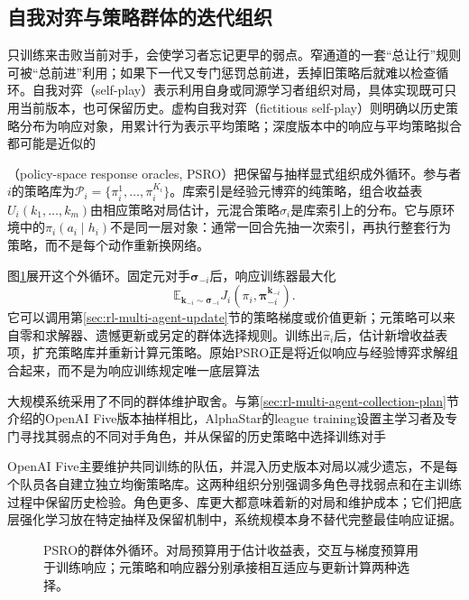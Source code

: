 \subsection{自我对弈与策略群体的迭代组织}
\label{sec:rl-multi-agent-population}

只训练来击败当前对手，会使学习者忘记更早的弱点。窄通道的一套“总让行”规则可被“总前进”利用；如果下一代又专门惩罚总前进，丢掉旧策略后就难以检查循环。自我对弈（self-play）表示利用自身或同源学习者组织对局，具体实现既可只用当前版本，也可保留历史。虚构自我对弈（fictitious self-play）则明确以历史策略分布为响应对象，用累计行为表示平均策略；深度版本中的响应与平均策略拟合都可能是近似的

（policy-space response oracles, PSRO）把保留与抽样显式组织成外循环。参与者$i$的策略库为$\mathcal P_i=\{\pi_i^1,\ldots,\pi_i^{K_i}\}$。库索引是经验元博弈的纯策略，组合收益表
$U_i(k_1,\ldots,k_m)$由相应策略对局估计，元混合策略$\sigma_i$是库索引上的分布。它与原环境中的$\pi_i(a_i\mid h_i)$不是同一层对象：通常一回合先抽一次索引，再执行整套行为策略，而不是每个动作重新换网络。

图\ref{fig:rl-multi-agent-psro}展开这个外循环。固定元对手$\bm\sigma_{-i}$后，响应训练器最大化
\[
 \mathbb E_{\bm k_{-i}\sim\bm\sigma_{-i}}
       J_i(\pi_i,\bm\pi_{-i}^{\bm k_{-i}}).
\]
它可以调用第\ref{sec:rl-multi-agent-update}节的策略梯度或价值更新；元策略可以来自零和求解器、遗憾更新或另定的群体选择规则。训练出$\hat\pi_i$后，估计新增收益表项，扩充策略库并重新计算元策略。原始PSRO正是将近似响应与经验博弈求解组合起来，而不是为响应训练规定唯一底层算法

大规模系统采用了不同的群体维护取舍。与第\ref{sec:rl-multi-agent-collection-plan}节介绍的OpenAI Five版本抽样相比，AlphaStar的league training设置主学习者及专门寻找其弱点的不同对手角色，并从保留的历史策略中选择训练对手

OpenAI Five主要维护共同训练的队伍，并混入历史版本对局以减少遗忘，不是每个队员各自建立独立均衡策略库。这两种组织分别强调多角色寻找弱点和在主训练过程中保留历史检验。角色更多、库更大都意味着新的对局和维护成本；它们把底层强化学习放在特定抽样及保留机制中，系统规模本身不替代完整最佳响应证据。

\begin{figure}[htbp]
 \centering
 
 \caption{PSRO的群体外循环。对局预算用于估计收益表，交互与梯度预算用于训练响应；元策略和响应器分别承接相互适应与更新计算两种选择。}
 \label{fig:rl-multi-agent-psro}
\end{figure}

